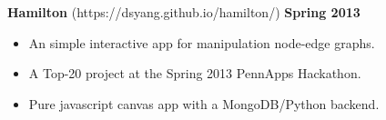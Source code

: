 \documentclass[sectioned]{dsyangres}
\begin{document}
\begin{resume}
\textbf{Hamilton} (https://dsyang.github.io/hamilton/)
\hfill \textbf{Spring 2013}
  \begin{itemize} \itemsep -2pt
    \item An simple interactive app for manipulation node-edge graphs.
    \item A Top-20 project at the Spring 2013 PennApps Hackathon.
    \item Pure javascript canvas app with a MongoDB/Python backend.
  \end{itemize}






\end{resume}
\end{document}
